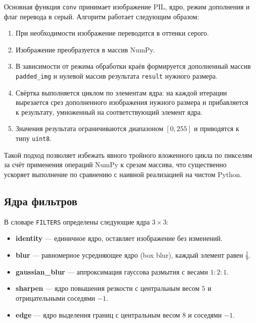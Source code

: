 \documentclass[a4paper]{article}
\begin{document}
Основная функция \verb|conv| принимает изображение PIL, ядро, режим дополнения и флаг перевода в серый. Алгоритм работает следующим образом:

\begin{enumerate}[leftmargin=3.5em, topsep=0pt]
    \item При необходимости изображение переводится в оттенки серого.
    \item Изображение преобразуется в массив NumPy.
    \item В зависимости от режима обработки краёв формируется дополненный массив \verb|padded_img| и нулевой массив результата \verb|result| нужного размера.
    \item Свёртка выполняется циклом по элементам ядра: на каждой итерации вырезается срез дополненного изображения нужного размера и прибавляется к результату, умноженный на соответствующий элемент ядра.
    \item Значения результата ограничиваются диапазоном $[0, 255]$ и приводятся к типу \verb|uint8|.
\end{enumerate}

Такой подход позволяет избежать явного тройного вложенного цикла по пикселям за счёт применения операций NumPy к срезам массива, что существенно ускоряет выполнение по сравнению с наивной реализацией на чистом Python.

\subsection{Ядра фильтров}

В словаре \verb|FILTERS| определены следующие ядра $3 \times 3$:

\begin{itemize}[leftmargin=3.5em, topsep=0pt]
    \item \textbf{identity} --- единичное ядро, оставляет изображение без изменений.
    \item \textbf{blur} --- равномерное усредняющее ядро (box blur), каждый элемент равен $\tfrac{1}{9}$.
    \item \textbf{gaussian\_blur} --- аппроксимация гауссова размытия с весами $1{:}2{:}1$.
    \item \textbf{sharpen} --- ядро повышения резкости с центральным весом $5$ и отрицательными соседями $-1$.
    \item \textbf{edge} --- ядро выделения границ с центральным весом $8$ и соседями $-1$.
\end{itemize}
\end{document}
